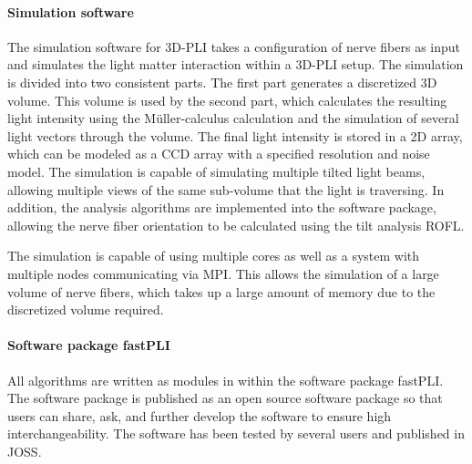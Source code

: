 \paragraph{Simulation software}
%
The simulation software for \ac{3D-PLI} takes a configuration of nerve fibers as input and simulates the light matter interaction within a \ac{3D-PLI} setup.
The simulation is divided into two consistent parts.
The first part generates a discretized 3D volume.
This volume is used by the second part, which calculates the resulting light intensity using the M{\"u}ller-calculus calculation and the simulation of several light vectors through the volume.
The final light intensity is stored in a 2D array, which can be modeled as a \ac{CCD} array with a specified resolution and noise model.
The simulation is capable of simulating multiple tilted light beams, allowing multiple views of the same sub-volume that the light is traversing.
In addition, the analysis algorithms are implemented into the software package, allowing the nerve fiber orientation to be calculated using the tilt analysis \ac{ROFL}.
\par
%
The simulation is capable of using multiple cores as well as a system with multiple nodes communicating via \ac{MPI}.
This allows the simulation of a large volume of nerve fibers, which takes up a large amount of memory due to the discretized volume required.
%
%
%
\paragraph{Software package \acs{fastPLI}}
%
All algorithms are written as modules in \python{} within the software package \ac{fastPLI}.
The software package is published as an open source software package so that users can share, ask, and further develop the software to ensure high interchangeability.
The software has been tested by several users and published in \ac{JOSS}.
%
%
%
